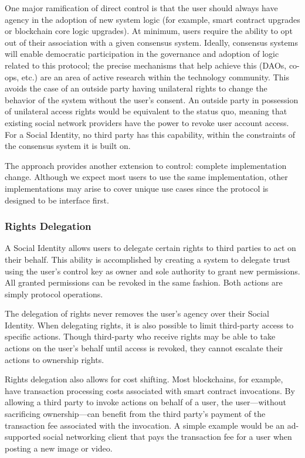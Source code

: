 \documentclass[12pt,letterpaper]{article}
\begin{document}
One major ramification of direct control is that the user should always have agency in the
adoption of new system logic (for example, smart contract upgrades or blockchain core logic
upgrades). At minimum, users require the ability to opt out of their association with a
given consensus system. Ideally, consensus systems will enable democratic participation in
the governance and adoption of logic related to this protocol; the precise mechanisms that
help achieve this (DAOs, co-ops, etc.) are an area of active research within the technology
community.  This avoids the case of an outside party having unilateral rights to change the
behavior of the system without the user's consent. An outside party in possession of
unilateral access rights would be equivalent to the status quo, meaning that existing social
network providers have the power to revoke user account access. For a Social Identity, no
third party has this capability, within the constraints of the consensus system it is built on.

The  approach provides another extension to control: complete
implementation change. Although we expect most users to use the same implementation, other
implementations may arise to cover unique use cases since the protocol is designed to be
interface first.

\subsubsection{Rights Delegation}

A Social Identity allows users to delegate certain rights to third parties to act on their
behalf. This ability is accomplished by creating a system to delegate trust using the user's
control key as owner and sole authority to grant new permissions. All granted permissions
can be revoked in the same fashion. Both actions are simply protocol operations.

The delegation of rights never removes the user's agency over their Social Identity. When
delegating rights, it is also possible to limit third-party access to specific actions.
Though third-party  who receive rights may be able to take actions on the
user's behalf until access is revoked, they cannot escalate their actions to ownership
rights.

Rights delegation also allows for cost shifting. Most blockchains, for example, have
transaction processing costs associated with smart contract invocations. By allowing a third
party to invoke actions on behalf of a user, the user---without sacrificing ownership---can
benefit from the third party's payment of the transaction fee associated with the
invocation. A simple example would be an ad-supported social networking client that pays the
transaction fee for a user when posting a new image or video.
\end{document}
